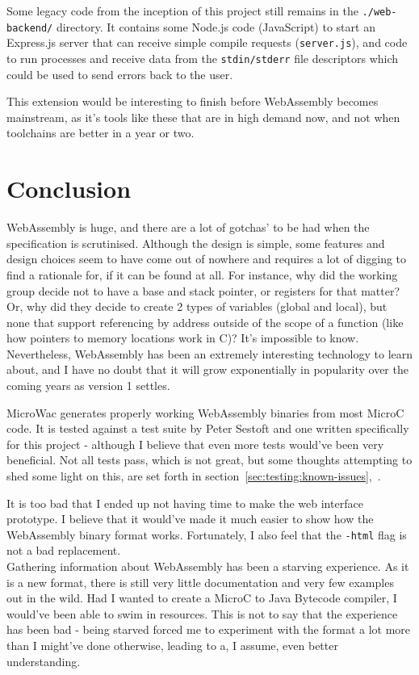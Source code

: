 \documentclass[a4paper]{article}
\begin{document}
Some legacy code from the inception of this project still remains in the \texttt{./web-backend/} directory. It contains some Node.js code (JavaScript) to start an Express.js server that can receive simple compile requests (\texttt{server.js}), and code to run processes and receive data from the \texttt{stdin/stderr} file descriptors which could be used to send errors back to the user.

This extension would be interesting to finish before WebAssembly becomes mainstream, as it's tools like these that are in high demand now, and not when toolchains are better in a year or two.

\newpage
\section{Conclusion}
\label{sec:conclusion}
WebAssembly is huge, and there are a lot of gotchas' to be had when the specification is scrutinised. Although the design is simple, some features and design choices seem to have come out of nowhere and requires a lot of digging to find a rationale for, if it can be found at all. For instance, why did the working group decide not to have a base and stack pointer, or registers for that matter? Or, why did they decide to create 2 types of variables (global and local), but none that support referencing by address outside of the scope of a function (like how pointers to memory locations work in C)? It's impossible to know. Nevertheless, WebAssembly has been an extremely interesting technology to learn about, and I have no doubt that it will grow exponentially in popularity over the coming years as version 1 settles.

MicroWac generates properly working WebAssembly binaries from most MicroC code. It is tested against a test suite by Peter Sestoft and one written specifically for this project - although I believe that even more tests would've been very beneficial. Not all tests pass, which is not great, but some thoughts attempting to shed some light on this, are set forth in section~\ref{sec:testing:known-issues},~.

It is too bad that I ended up not having time to make the web interface prototype. I believe that it would've made it much easier to show how the WebAssembly binary format works. Fortunately, I also feel that the \texttt{-html} flag is not a bad replacement.\\

\noindent Gathering information about WebAssembly has been a starving experience. As it is a new format, there is still very little documentation and very few examples out in the wild. Had I wanted to create a MicroC to Java Bytecode compiler, I would've been able to swim in resources. This is not to say that the experience has been bad - being starved forced me to experiment with the format a lot more than I might've done otherwise, leading to a, I assume, even better understanding.\\
\end{document}
